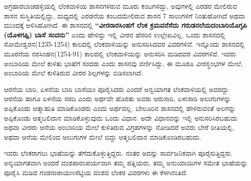 ಅಗ್ರಹಾರಬಾಚಹಳ್ಳಿಯಲ್ಲಿ ಲೆಂಕವಾಳಿಯ ಶಾಸನಗಳಿರುವ ಮೂರು ಕಂಬಗಳಿದ್ದು, ಅವುಗಳಲ್ಲಿ ಎರಡರ ಮೇಲಿರುವ ಶಾಸನ ಸುಸ್ಥಿತಿಯಲ್ಲಿದ್ದು, ಮಧ್ಯದಲ್ಲಿ ಎರಡನೆಯ ಕಂಬದಮೇಲಿರುವ ಶಾಸನ 7 ಸಾಲುಗಳಿಗೆ ನಿಂತುಹೋಗಿದೆ ಅಥವಾ ಮುಂದಕ್ಕೆ ಅಳಿಸಿಹೋಗಿದೆ. ಈ ಶಾಸನದಲ್ಲಿ \textbf{“ವೀರನಾರಸಿಂಹಗೆ ಲೆಂಕ ಕ್ರಮವನೆಸೆದು ಗರುಡನಲೆಯದಂಬಾರಿಯೊಗ್ಳಪಿ (ಯೊಳಗಪ್ಪಿ) ಬಾಸೆ ಸಂದನು”} ಎಂದು ಹೇಳಿದ್ದು ಇಲ್ಲಿ ವೀರನ ಹೆಸರಿನ ಉಲ್ಲೇಖವಿಲ್ಲ. ಒಂದು ಶಾಸನದಲ್ಲಿ ಸೋಮೇಶ್ವರನ\break (1235-1254) ಕಾಲದಲ್ಲಿ ಲೆಂಕವಾಳಿಯನ್ನು ಅನುಸರಿಸಿದವರ ವಿವರಗಳಿವೆ. ಇನ್ನೊಂದು ಶಾಸನದಲ್ಲಿ ಮೂರನೆಯ ನರಸಿಂಹನ(1254-91) ಕಾಲದಲ್ಲಿ ಲೆಂಕವಾಳಿಯನ್ನು ಅನುಸರಿಸಿ ಮಡಿದವರ ವಿವರಗಳಿವೆ. ಇವರು ಅಂಬಾರಿಯ ಮೇಲೆ ಕುಳಿತು ಭಾಷೆಗೆ ಸಂದರು ಎಂದು ಶಾಸನವು ವರ್ಣಿಸಿದ್ದು, ಈ ಮೂರೂ ವೀರಸ್ಥಂಭಗಳ ಮೇಲೆ, ಅಂಬಾರಿಯ ಮೇಲೆ ಕುಳಿತಿರುವ ವೀರರ ಶಿಲ್ಪಗಳನ್ನು ಬಿಡಿಸಲಾಗಿದೆ.

ಆರನೆಯ ಬಾರಿ, ಏಳನೆಯ ಬಾರಿ ಬಾಸೆಯಂ ಪೂರೈಸಿದರು ಎಂದರೆ ಅನ್ವಯಾಗತ ಲೆಂಕವಾಳಿಯಲ್ಲಿ ಅವರದ್ದು ಆರನೆಯ ಹಾಗೂ ಏಳನೆಯ ಸರದಿ ಎಂದು ಅರ್ಥವೇ ಹೊರತು ಅವರು ಆರುಸಾರಿ, ಏಳುಸಾರಿ ಅಲುಗುಗಳನ್ನು ಅಪ್ಪಿಕೊಂಡು ಆತ್ಮಾಹುತಿ ಮಾಡಿಕೊಂಡರು ಎಂದು ಅರ್ಥವಲ್ಲ. ಬೇಲೂರಿನ ಶಾಸನದಲ್ಲಿ ಹೇಳಿರುವಂತೆ ಅಲಗನ್ನು ಅಪ್ಪಿಕೊಂಡು ಆತ್ಮಬಲಿದಾನ ಮಾಡಿಕೊಳ್ಳುವುದು ಒಂದು ವಿಧಾನ. ಅದೇ ವಿಧಾನವನ್ನು ಇಲ್ಲಿ ಅನುಸರಿಸಿರಬಹುದು ಅಥವಾ ವೀರರು ಆನೆಯ ಅಂಬಾರಿಯ ಮೇಲೆ ಕುಳಿತಿರುವ ವಿಗ್ರಹಗಳನ್ನು ನೋಡಿದರೆ ಅವರು ಬೇರೆ ರೀತಿಯಲ್ಲಿ, ಅಥವಾ ಆನೆಯ ಮೇಲಿಂದ ಅಲುಗುಗಳ ಮೇಲೆ ಬಿದ್ದು ಆತ್ಮಬಲಿದಾನ ಮಾಡಿಕೊಂಡಿರಬಹುದು.

ಇವರು ಲೆಂಕರಾಗಲು ಭಾಷೆಯನ್ನು ತೆಗೆದುಕೊಳ್ಳುತ್ತಿದ್ದರು. ನಂತರ ಅದನ್ನು ಸಾರ್ವಜನಿಕವಾಗಿ ಪೂರೈಸುತ್ತಿದ್ದರು. ಅನ್ವಯಾಗತವಾಗಿ ಅಂದರೆ ವಂಶಪಾರಂಪರ್ಯವಾಗಿ ತಮ್ಮ ಪತ್ನಿಯರು, ತಮ್ಮ ಅನುಯಾಯಿಗಳ ಸಮೇತ ಭಾಷೆಯನ್ನು ಪೂರೈಸಿ ಮಡಿದ ಗಂಡನಾರಾಯಣಸೆಟ್ಟಿಯ ವಂಶದ ಲೆಂಕರ ವಿವರಗಳು ಈ ಕೆಳಗಿನಂತಿದೆ.


